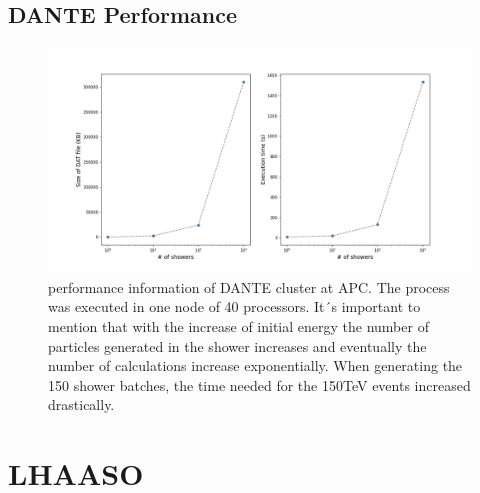 \documentclass{article}
\begin{document}
\begin{appendices}
\subsection{DANTE Performance}
\begin{figure}[!h]
    \centering
    \includegraphics[width=\textwidth]{imgs/corsikaDantePerformance.png}
    \caption{performance information of DANTE cluster at APC. The process was executed in one node of 40 processors. It´s important to mention that with the increase of initial energy the number of particles generated in the shower increases and eventually the number of calculations increase exponentially. When generating the 150 shower batches, the time needed for the 150TeV events increased drastically. }
    \label{fig:DANTEperformance}
\end{figure}

\newpage
\section{LHAASO}

\end{appendices}
\end{document}
